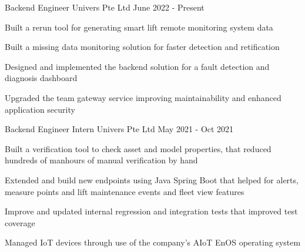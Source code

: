 

\begin{cventries}

  \cventry
    {Backend Engineer} %
    {Univers Pte Ltd} %
    {} %
    {June 2022 - Present} %
    {
      \begin{cvitems} %
        \item {Built a rerun tool for generating smart lift remote monitoring system data}
        \item {Built a missing data monitoring solution for faster detection and retification}
        \item {Designed and implemented the backend solution for a fault detection and diagnosis dashboard}
        \item {Upgraded the team gateway service improving maintainability and enhanced application security}
      \end{cvitems}
    }

  \cventry
    {Backend Engineer Intern} %
    {Univers Pte Ltd} %
    {} %
    {May 2021 - Oct 2021} %
    {
      \begin{cvitems} %
        \item {Built a verification tool to check asset and model properties, that reduced hundreds of manhours of manual verification by hand}
        \item {Extended and build new endpoints using Java Spring Boot that helped for alerts, measure points and lift maintenance events and fleet view features}
        \item {Improve and updated internal regression and integration tests that improved test coverage}
        \item {Managed IoT devices through use of the company's AIoT EnOS operating system}
      \end{cvitems}
    }


\end{cventries}
